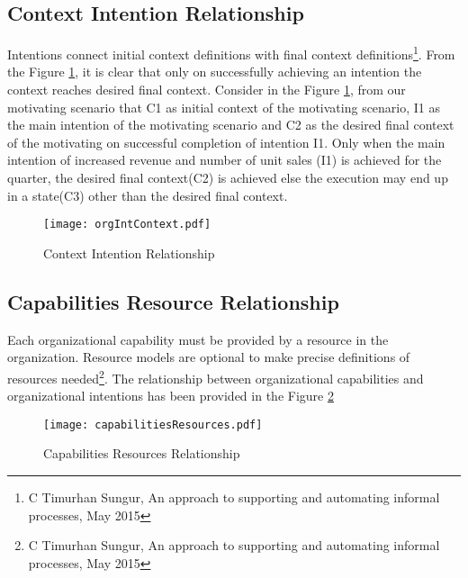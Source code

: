 \subsection{Context Intention Relationship}
\label{sec:ctxintrel}
Intentions connect initial context definitions with final context definitions\footnote{C Timurhan Sungur, An approach to supporting and automating informal processes, May 2015}. From the Figure \ref{fig:orgIntentions}, it is clear that only on successfully achieving an intention the context reaches desired final context. Consider in the Figure \ref{fig:orgIntentions}, from our motivating scenario that C1 as initial context of the motivating scenario, I1 as the main intention of the motivating scenario and C2 as the desired final context of the motivating on successful completion of intention I1. Only when the main intention of increased revenue and number of unit sales (I1) is achieved for the quarter, the desired final context(C2) is achieved else the execution may end up in a state(C3) other than the desired final context. 

\begin{figure}
	\centering
	\texttt{[image: orgIntContext.pdf]}
	\caption{Context Intention Relationship}
	\label{fig:orgIntentions}
\end{figure}

\subsection{Capabilities Resource Relationship}
\label{sec:capIntRel}
Each organizational capability must be provided by a resource in the organization. Resource models are optional to make precise definitions of resources needed\footnote{C Timurhan Sungur, An approach to supporting and automating informal processes, May 2015}. The relationship between organizational capabilities and organizational intentions has been provided in the Figure \ref{fig:capabilitiesresources}
 
\begin{figure}
	\centering
	\texttt{[image: capabilitiesResources.pdf]}
	\caption{Capabilities Resources Relationship}
	\label{fig:capabilitiesresources}
\end{figure}

